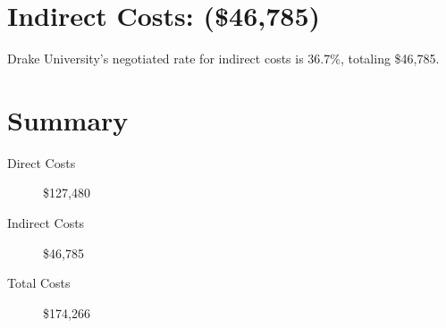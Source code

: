 \documentclass[11pt]{article}
\begin{document}
    \section*{Indirect Costs: (\$46,785)}
    Drake University's negotiated rate for indirect costs is 36.7\%, totaling \$46,785.

    \section*{Summary}
    \begin{description}
        \item[Direct Costs] \$127,480
        \item[Indirect Costs] \$46,785
        \item[Total Costs] \$174,266
    \end{description}
\end{document}
